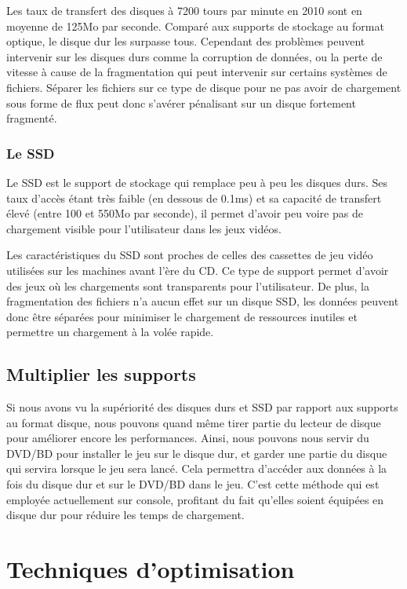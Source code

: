 \documentclass[a4paper, 12pt]{article} %
\begin{document}
Les taux de transfert des disques à 7200 tours par minute en 2010 sont en moyenne de 125Mo par seconde. Comparé aux supports de stockage au format optique, le disque dur les surpasse tous. Cependant des problèmes peuvent intervenir sur les disques durs comme la corruption de données, ou la perte de vitesse à cause de la fragmentation qui peut intervenir sur certains systèmes de fichiers. Séparer les fichiers sur ce type de disque pour ne pas avoir de chargement sous forme de flux peut donc s'avérer pénalisant sur un disque fortement fragmenté.

\subsubsection{Le SSD}
Le SSD est le support de stockage qui remplace peu à peu les disques durs. Ses taux d'accès étant très faible (en dessous de 0.1ms) et sa capacité de transfert élevé (entre 100 et 550Mo par seconde)\cite{hardware:ssdspeed}, il permet d'avoir peu voire pas de chargement visible pour l'utilisateur dans les jeux vidéos. 

Les caractéristiques du SSD sont proches de celles des cassettes de jeu vidéo utilisées sur les machines avant l'ère du CD. Ce type de support permet d'avoir des jeux où les chargements sont transparents pour l'utilisateur. De plus, la fragmentation des fichiers n'a aucun effet sur un disque SSD, les données peuvent donc être séparées pour minimiser le chargement de ressources inutiles et permettre un chargement à la volée rapide.

\subsection{Multiplier les supports}
Si nous avons vu la supériorité des disques durs et SSD par rapport aux supports au format disque, nous pouvons quand même tirer partie du lecteur de disque pour améliorer encore les performances. Ainsi, nous pouvons nous servir du DVD/BD pour installer le jeu sur le disque dur, et garder une partie du disque qui servira lorsque le jeu sera lancé. Cela permettra d'accéder aux données à la fois du disque dur et sur le DVD/BD dans le jeu. C'est cette méthode qui est employée actuellement sur console, profitant du fait qu'elles soient équipées en disque dur pour réduire les temps de chargement.

\newpage
\section{Techniques d'optimisation}
\end{document}
